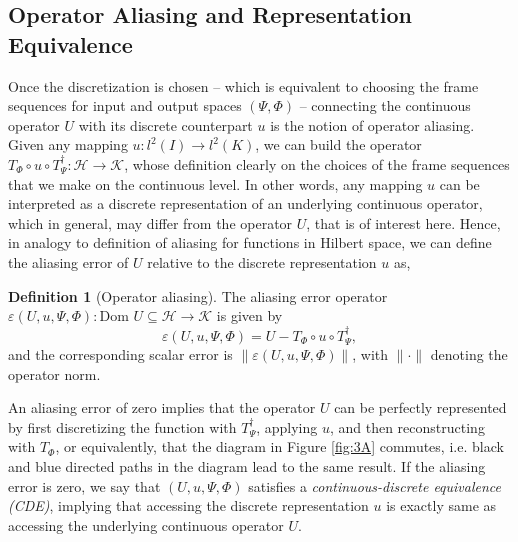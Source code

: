 \documentclass[reqno,10pt]{amsart}
\theoremstyle{plain}
\theoremstyle{definition}
\newtheorem{defn}{Definition}
\newcommand{\cal}[1]{\mathcal{#1}}
\begin{document}
    \subsection{\bf Operator Aliasing and Representation Equivalence}
    Once the discretization is chosen -- which is equivalent to choosing the frame sequences for input and output spaces $(\Psi,\Phi)$ -- connecting the continuous operator $U$ with its discrete counterpart $u$ is the notion of operator aliasing. Given any mapping $u : l^2(I) \to l^2(K)$, we can build the operator $T_\Phi \circ u \circ T_\Psi^\dag : \cal H \to \cal K$, whose definition clearly on the choices of the frame sequences that we make on the continuous level. In other words, any mapping $u$ can be interpreted as a discrete representation of an underlying continuous operator, which in general, may differ from the operator $U$, that is of interest here. Hence, in analogy to definition of aliasing for functions in Hilbert space, we can define the aliasing error of $U$ relative to the discrete representation $u$ as,
    \begin{defn}[Operator aliasing]\label{def:opalias}
        The aliasing error operator $\varepsilon(U,u,\Psi,\Phi):\text{Dom }U \subseteq \cal H \to \cal K$ is given by
        $$ \varepsilon(U,u,\Psi,\Phi) = U - T_\Phi \circ u \circ T_\Psi^\dag,$$
        and the corresponding scalar error is $\|\varepsilon(U, u, \Psi, \Phi)\|$, with $\|\cdot\|$ denoting the operator norm.
    \end{defn}
    \noindent An aliasing error of zero implies that the operator $U$ can be perfectly represented by first discretizing the function with $T_\Psi^\dag$, applying $u$, and then reconstructing with $T_\Phi$, or equivalently, that the diagram in Figure \ref{fig:3A} commutes, i.e. black and blue directed paths in the diagram lead to the same result. If the aliasing error is zero, we say that $(U, u, \Psi, \Phi)$ satisfies a {\it continuous-discrete equivalence (CDE)}, implying that accessing the discrete representation $u$ is exactly same as accessing the underlying continuous operator $U$.
\end{document}
